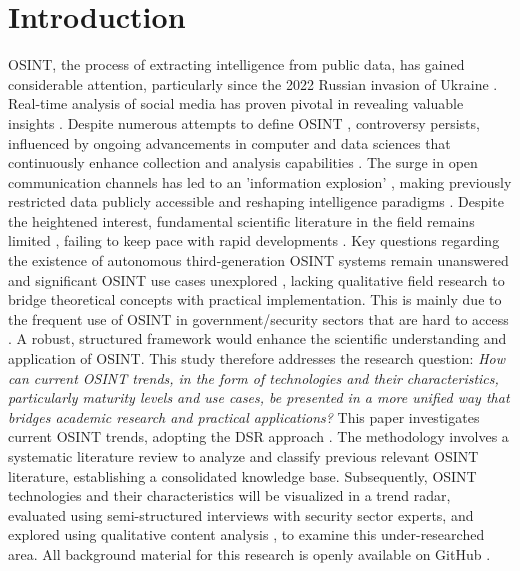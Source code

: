 \documentclass[10pt]{article}
\begin{document}
\section{Introduction} \label{sec:introduction}

OSINT, the process of extracting intelligence from public data, has gained considerable attention, particularly since
the 2022 Russian invasion of Ukraine \cite{DosPassos.2017}. Real-time analysis of social media has proven pivotal in revealing
valuable insights \cite{SmithBoyle.24.07.2023}. Despite numerous attempts to define OSINT
\cite{Hwang.2022, PastorGalindo.2020, Yogish.2021}, controversy persists, influenced by ongoing advancements in computer and
data sciences that continuously enhance collection and analysis capabilities \cite{Ghioni.2023, Williams.2018}.
The surge in open communication channels has led to an 'information explosion' \cite{DosPassos.2017, Hwang.2022, Yogish.2021},
making previously restricted data publicly accessible \cite{Hwang.2022, Williams.2018} and reshaping intelligence paradigms \cite{Dokman.2020}.
Despite the heightened interest, fundamental scientific literature in the field remains limited \cite{HerreraCubides.2020},
failing to keep pace with rapid developments \cite{Ghioni.2023, Williams.2018}. Key questions regarding the existence of
autonomous third-generation OSINT systems \cite{PastorGalindo.2019, PastorGalindo.2020} remain unanswered
\cite{Ghioni.2023, PastorGalindo.2020, Yogish.2021} and significant OSINT use cases unexplored
\cite{AlKilani.2021, Dokman.2020, Ghioni.2023}, lacking qualitative field research to bridge theoretical concepts with
practical implementation. This is mainly due to the frequent use of OSINT in government/security sectors that are hard to access \cite{HerreraCubides.2020, PastorGalindo.2019}. A robust, structured framework would enhance the scientific understanding and application of OSINT. This study therefore addresses the research question:
\textit{How can current OSINT trends, in the form of technologies and their characteristics, particularly maturity levels and use cases, be presented in a more unified way that bridges academic research and practical applications?}
This paper investigates current OSINT trends, adopting the DSR approach \cite{Peffers.2007}.
The methodology involves a systematic literature review \cite{Webster.2002} to analyze and classify previous relevant OSINT literature, establishing a consolidated knowledge base.
Subsequently, OSINT technologies and their characteristics will be visualized in a trend radar, evaluated using semi-structured
interviews \cite{Bogner.2014} with security sector experts, and explored using qualitative content analysis \cite{Billings.1997}, to examine this under-researched area. All background material for this research is openly available on GitHub \cite{kayser2024}.
\end{document}
